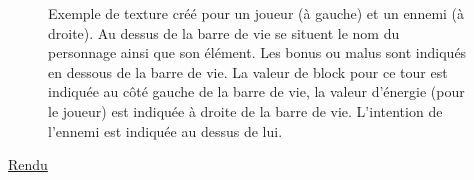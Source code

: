\begin{figure}[h]
\begin{center}
%
\qquad
{}%
\caption{\label{slaythespiregame}Exemple de texture créé pour un joueur (à gauche) et un ennemi (à droite). Au dessus de la barre de vie se situent le nom du personnage ainsi que son élément. Les bonus ou malus sont indiqués en dessous de la barre de vie. La valeur de block pour ce tour est indiquée au côté gauche de la barre de vie, la valeur d'énergie (pour le joueur) est indiquée à droite de la barre de vie. L'intention de l'ennemi est indiquée au dessus de lui.}
\end{center}
\end{figure}

\underline{Rendu}


